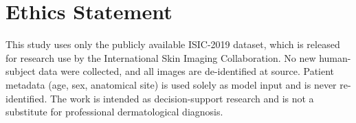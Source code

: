 \section*{Ethics Statement}

This study uses only the publicly available ISIC-2019 dataset, which is
released for research use by the International Skin Imaging Collaboration.
No new human-subject data were collected, and all images are de-identified at
source. Patient metadata (age, sex, anatomical site) is used solely as model
input and is never re-identified. The work is intended as decision-support
research and is not a substitute for professional dermatological diagnosis.

\pagebreak
